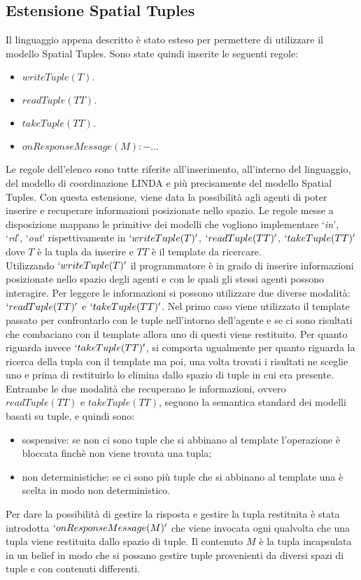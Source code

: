 \subsection{Estensione Spatial Tuples}
Il linguaggio appena descritto è stato esteso per permettere di utilizzare il modello Spatial Tuples. Sono state quindi inserite le seguenti regole:
\begin{itemize}
\item $writeTuple(T).$
\item $readTuple(TT).$
\item $takeTuple(TT).$
\item $onResponseMessage(M) :- \ldots$
\end{itemize}
Le regole dell'elenco sono tutte riferite all'inserimento, all'interno del linguaggio, del modello di coordinazione LINDA e più precisamente del modello Spatial Tuples.
Con questa estensione, viene data la possibilità agli agenti di poter inserire e recuperare informazioni posizionate nello spazio. Le regole messe a disposizione mappano le primitive dei modelli che vogliono implementare `\textit{in}', `\textit{rd}', `\textit{out}' rispettivamente in $`writeTuple(T)'$, $`readTuple(TT)'$, $`takeTuple(TT)'$ dove $T$ è la tupla da inserire e $TT$ è il template da ricercare.
\\
Utilizzando $`writeTuple(T)'$ il programmatore è in grado di inserire informazioni posizionate nello spazio degli agenti e con le quali gli stessi agenti possono interagire. Per leggere le informazioni si possono utilizzare due diverse modalità: $`readTuple(TT)'$ e $`takeTuple(TT)'$. Nel primo caso viene utilizzato il template passato per confrontarlo con le tuple nell'intorno dell'agente e se ci sono risultati che combaciano con il template allora uno di questi viene restituito. Per quanto riguarda invece $`takeTuple(TT)'$, si comporta ugualmente per quanto riguarda la ricerca della tupla con il template ma poi, una volta trovati i risultati ne sceglie uno e prima di restituirlo lo elimina dallo spazio di tuple in cui era presente.
\\
Entrambe le due modalità che recuperano le informazioni, ovvero $readTuple(TT)$ e $takeTuple(TT)$, seguono la semantica standard dei modelli basati su tuple, e quindi sono:
\begin{itemize}
\item sospensive: se non ci sono tuple che si abbinano al template l'operazione è bloccata finchè non viene trovata una tupla;
\item non deterministiche: se ci sono più tuple che si abbinano al template una è scelta in modo non deterministico.
\end{itemize}
Per dare la possibilità di gestire la risposta e gestire la tupla restituita è stata introdotta $`onResponseMessage(M)'$ che viene invocata ogni qualvolta che una tupla viene restituita dallo spazio di tuple. Il contenuto $M$ è la tupla incapsulata in un belief in modo che si possano gestire tuple provenienti da diversi spazi di tuple e con contenuti differenti.

